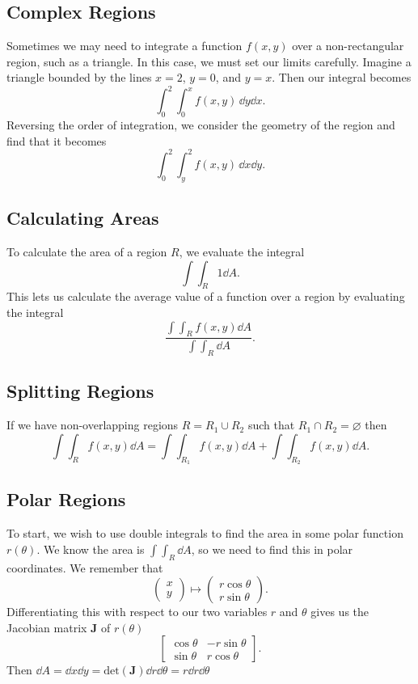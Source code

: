 \documentclass[12pt]{article}
\theoremstyle{plain} %
\theoremstyle{definition}
\theoremstyle{definition}
\theoremstyle{definition}
\theoremstyle{remark}
\begin{document}
\subsection{Complex Regions}
Sometimes we may need to integrate a function $f(x,y)$ over a non-rectangular region, such as a triangle. In this case, we must set our limits carefully. Imagine a triangle bounded by the lines $x=2$, $y=0$, and $y=x$. Then our integral becomes
\[ \int_0^2 \int_0^x f(x,y) \, \dd{y} \dd{x}.\]
Reversing the order of integration, we consider the geometry of the region and find that it becomes
\[ \int_0^2 \int_y^2 f(x,y) \, \dd{x} \dd{y}.\]

\subsection{Calculating Areas}
To calculate the area of a region $R$, we evaluate the integral
\[ \int \int_R 1 \dd{A} .\]
This lets us calculate the average value of a function over a region by evaluating the integral
    \[ \frac{\int \int_R f(x,y) \dd{A}}{\int \int_R \dd{A}} .\]
\subsection{Splitting Regions}
If we have non-overlapping regions $R = R_1 \cup R_2$ such that $R_1 \cap R_2 = \varnothing$ then
\[\int\int_R f(x,y) \dd{A} = \int\int_{R_1} f(x,y) \dd{A} + \int\int_{R_2} f(x,y) \dd{A}.\]

\subsection{Polar Regions}
To start, we wish to use double integrals to find the area in some polar function $r(\theta)$. We know the area is $\int\int_R \dd{A}$, so we need to find this in polar coordinates. We remember that
\[ \begin{pmatrix}
    x \\ y
\end{pmatrix} \mapsto \begin{pmatrix}
    r\cos{\theta} \\ r\sin{\theta}
\end{pmatrix}. \]
Differentiating this with respect to our two variables $r$ and $\theta$ gives us the Jacobian matrix $\mathbf{J}$ of $r(\theta)$
\[ \begin{bmatrix}
    \cos{\theta} & -r\sin{\theta} \\
    \sin{\theta} & r\cos{\theta}
\end{bmatrix}. \]
Then $\dd{A} = \dd{x}\dd{y} = \text{det}(\mathbf{J})\dd{r}\dd{\theta} = r\dd{r}\dd{\theta}$
\end{document}
